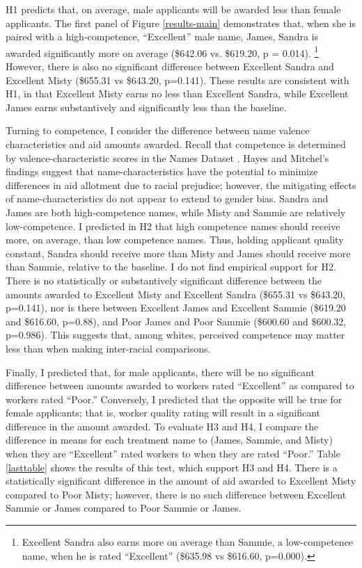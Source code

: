 \documentclass[12pt]{article}%
\begin{document}
\begin{doublespace}
H1 predicts that, on average, male applicants will be awarded less than female applicants. The first panel of Figure \ref{results-main} demonstrates that, when she is paired with a high-competence, ``Excellent” male name, James, Sandra is awarded significantly more on average (\$642.06 vs. \$619.20, p = 0.014). \footnote{Excellent Sandra also earns more on average than Sammie, a low-competence name, when he is rated ``Excellent” (\$635.98 vs \$616.60, p=0.000).} However, there is also no significant difference between Excellent Sandra and Excellent Misty (\$655.31 vs \$643.20, p=0.141). These results are consistent with H1, in that Excellent Misty earns no less than Excellent Sandra, while Excellent James earns substantively and significantly less than the baseline.

Turning to competence, I consider the difference between name valence characteristics and aid amounts awarded. Recall that competence is determined by valence-characteristic scores in the Names Dataset \citep{hayes_2020}. Hayes and Mitchel’s findings suggest that name-characteristics have the potential to minimize differences in aid allotment due to racial prejudice; however, the mitigating effects of name-characteristics do not appear to extend to gender bias. Sandra and James are both high-competence names, while Misty and Sammie are relatively low-competence. I predicted in H2 that high competence names should receive more, on average, than low competence names. Thus, holding applicant quality constant, Sandra should receive more than Misty and James should receive more than Sammie, relative to the baseline. I do not find empirical support for H2. There is no statistically or substantively significant difference between the amounts awarded to Excellent Misty and Excellent Sandra (\$655.31 vs \$643.20, p=0.141), nor is there between Excellent James and Excellent Sammie (\$619.20 and \$616.60, p=0.88), and Poor James and Poor Sammie (\$600.60 and \$600.32, p=0.986). This suggests that, among whites, perceived competence may matter less than when making inter-racial comparisons.

Finally, I predicted that, for male applicants, there will be no significant difference between amounts awarded to workers rated ``Excellent” as compared to workers rated ``Poor.” Conversely, I predicted that the opposite will be true for female applicants; that is, worker quality rating will result in a significant difference in the amount awarded. To evaluate H3 and H4, I compare the difference in means for each treatment name to (James, Sammie, and Misty) when they are ``Excellent” rated workers to when they are rated ``Poor.” Table \ref{lasttable} shows the results of this test, which support H3 and H4. There is a statistically significant difference in the amount of aid awarded to Excellent Misty compared to Poor Misty; however, there is no such difference between Excellent Sammie or James compared to Poor Sammie or James.


\end{doublespace}
\end{document}
